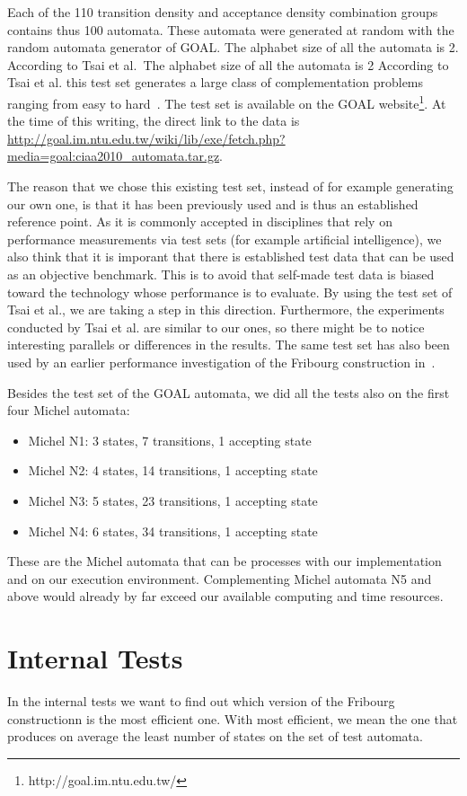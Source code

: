 Each of the 110 transition density and acceptance density combination groups contains thus 100 automata. These automata were generated at random with the random automata generator of GOAL. The alphabet size of all the automata is 2. According to Tsai et al.~The alphabet size of all the automata is 2 According to Tsai et al. this test set generates a large class of complementation problems ranging from easy to hard~\cite{2010_tsai}. The test set is available on the GOAL website\footnote{http://goal.im.ntu.edu.tw/}. At the time of this writing, the direct link to the data is \url{http://goal.im.ntu.edu.tw/wiki/lib/exe/fetch.php?media=goal:ciaa2010_automata.tar.gz}.

The reason that we chose this existing test set, instead of for example generating our own one, is that it has been previously used and is thus an established reference point. As it is commonly accepted in disciplines that rely on performance measurements via test sets (for example artificial intelligence), we also think that it is imporant that there is established test data that can be used as an objective benchmark. This is to avoid that self-made test data is biased toward the technology whose performance is to evaluate. By using the test set of Tsai et al., we are taking a step in this direction. Furthermore, the experiments conducted by Tsai et al. are similar to our ones, so there might be to notice interesting parallels or differences in the results. The same test set has also been used by an earlier performance investigation of the Fribourg construction in~\cite{2013_bsc_goettel}.

Besides the test set of the GOAL automata, we did all the tests also on the first four Michel automata:
\begin{itemize}
\item Michel N1: 3 states, 7 transitions, 1 accepting state
\item Michel N2: 4 states, 14 transitions, 1 accepting state
\item Michel N3: 5 states, 23 transitions, 1 accepting state
\item Michel N4: 6 states, 34 transitions, 1 accepting state
\end{itemize}

These are the Michel automata that can be processes with our implementation and on our execution environment. Complementing Michel automata N5 and above would already by far exceed our available computing and time resources.


\section{Internal Tests}
In the internal tests we want to find out which version of the Fribourg constructionn is the most efficient one. With most efficient, we mean the one that produces on average the least number of states on the set of test automata.

